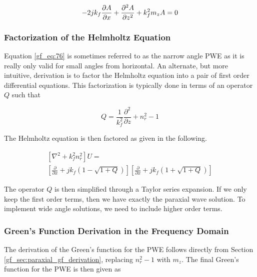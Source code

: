 \begin{equation}
-2jk_f\frac{\partial A}{\partial x} + \frac{\partial^2 A}{\partial z^2} +k_f^2m_zA = 0 \\
\label{gf_eq:76}
\end{equation}
\renewcommand{\baselinestretch}{2} \small\normalsize

\subsubsection{Factorization of the Helmholtz Equation}
Equation \ref{gf_eq:76} is sometimes referred to as the narrow angle PWE as it is really only valid for small angles from horizontal. An alternate, but more intuitive, derivation is to factor the Helmholtz equation into a pair of first order differential equations. This factorization is typically done in terms of an operator $Q$ \cite{kuttler_pe_theory} \cite{dockery_pe} such that

\begin{equation}
Q = \frac{1}{k_f^2}\frac{\partial^2}{\partial z} + n_r^2-1
\label{gf_pwe:1}
\end{equation}
\renewcommand{\baselinestretch}{2} \small\normalsize

The Helmholtz equation is then factored as given in the following.

\begin{equation}
\begin{gathered}
\left[\nabla^2 + k_f^2n_r^2\right]U = \\
\left[\frac{\partial}{\partial x}+jk_f\left(1-\sqrt{1+Q} \right) \right]\left[\frac{\partial}{\partial x}+jk_f\left(1+\sqrt{1+Q} \right)\right]
\end{gathered}
\label{gf_pwe:2}
\end{equation}
\renewcommand{\baselinestretch}{2} \small\normalsize

The operator $Q$ is then simplified through a Taylor series expansion. If we only keep the first order terms, then we have exactly the paraxial wave solution. To implement wide angle solutions, we need to include higher order terms.

\subsubsection{Green's Function Derivation in the Frequency Domain}
The derivation of the Green's function for the PWE follows directly from Section \ref{gf_sec:paraxial_gf_derivation}, replacing $n_r^2-1$ with $m_z$. The final Green's function for the PWE is then given as

